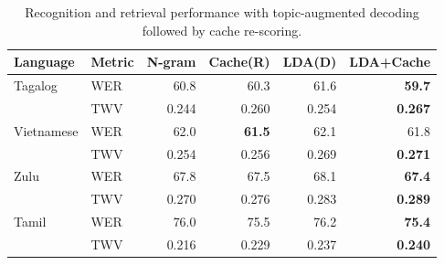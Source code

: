 \begin{table}
\centering
   \begin{tabular}{l|l|rrrr} \toprule
   \textbf{Language} & \textbf{Metric} & \textbf{N-gram} & \textbf{Cache(R)} & \textbf{LDA(D)} & \textbf{LDA+Cache} \\ \midrule
Tagalog & WER & 60.8 & 60.3 & 61.6 & \textbf{59.7} \\
        & TWV & 0.244 & 0.260 & 0.254 & \textbf{0.267} \\ \midrule
Vietnamese &   WER & 62.0 & \textbf{61.5} & 62.1 & 61.8 \\
        & TWV & 0.254 & 0.256 & 0.269 & \textbf{0.271}\\ \midrule
Zulu&   WER & 67.8 & 67.5 & 68.1 & \textbf{67.4} \\
        & TWV & 0.270 & 0.276 & 0.283 & \textbf{0.289} \\ \midrule
Tamil&   WER & 76.0 & 75.5 & 76.2 & \textbf{75.4}\\
        & TWV & 0.216 & 0.229 & 0.237 & \textbf{0.240} \\ \bottomrule
        \end{tabular}
\caption[Combined topic and cache-augmented LMs]{Recognition and retrieval performance with topic-augmented decoding followed by cache re-scoring.  \label{fig4:cascade}}
\end{table}

